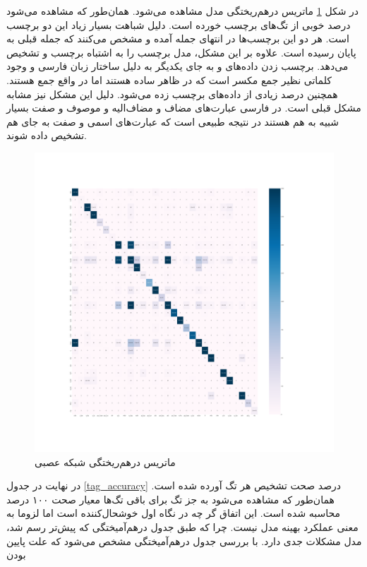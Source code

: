 \documentclass[12pt, a4paper]{article}
\begin{document}
در شکل \ref{confusion_matrix} ماتریس درهم‌ریختگی مدل مشاهده می‌شود. همان‌طور که مشاهده می‌شود
درصد خوبی از تگ‌های  برچسب  خورده است. دلیل
شباهت بسیار زیاد این دو برچسب است. هر دو این برچسب‌ها در انتهای جمله آمده و مشخص می‌کنند که
جمله قبلی به پایان رسیده است.
علاوه بر این مشکل، مدل برچسب  را به اشتباه برچسب  و  تشخیص می‌دهد.
برچسب زدن داده‌های  و  به جای یکدیگر به دلیل ساختار زبان فارسی و وجود کلماتی نظیر جمع مکسر
است که در ظاهر ساده هستند اما در واقع جمع هستند. همچنین درصد زیادی از داده‌های  برچسب
 زده می‌شود. دلیل این مشکل نیز مشابه مشکل قبلی است. در فارسی عبارت‌های مضاف‌ و مضاف‌الیه و موصوف و صفت
بسیار شبیه به هم هستند در نتیجه طبیعی است که عبارت‌های اسمی و صفت به جای هم تشخیص داده شوند.

\begin{figure}[h]
    \centering
    \includegraphics[width=0.8\linewidth]{images/confusion_matrix.png}
    \caption{ماتریس درهم‌ریختگی شبکه عصبی}
    \label{confusion_matrix}
\end{figure}

در نهایت در جدول \ref{tag_accuracy} درصد صحت تشخیص هر تگ آورده شده است. همان‌طور که مشاهده می‌شود به
جز تگ  برای باقی تگ‌ها معیار صحت ۱۰۰ درصد محاسبه شده است. این اتفاق گر چه در نگاه اول خوشحال‌کننده
است اما لزوما به معنی عملکرد بهینه مدل نیست. چرا که طبق جدول در‌هم‌آمیختگی که پیش‌تر رسم شد، مدل
مشکلات جدی دارد. با بررسی جدول درهم‌آمیختگی مشخص می‌شود که علت پایین بودن
\end{document}
